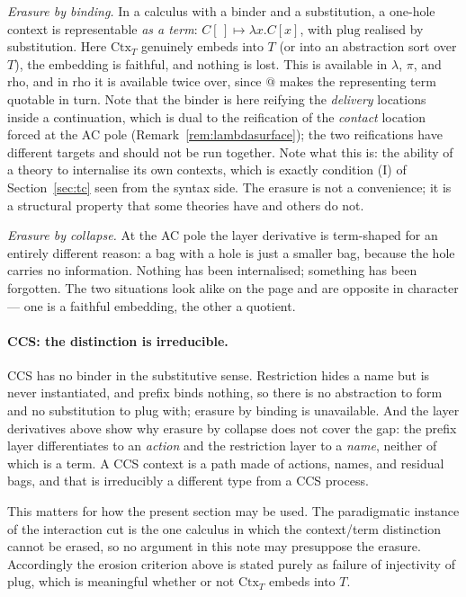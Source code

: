 \documentclass[11pt,a4paper]{article}
\theoremstyle{definition}
\theoremstyle{plain}
\theoremstyle{remark}
\newcommand{\Ctx}{\mathrm{Ctx}}
\begin{document}
\emph{Erasure by binding.} In a calculus with a binder and a substitution, a one-hole
context is representable \emph{as a term}: $C[\,] \mapsto \lambda x.C[x]$, with
$\mathrm{plug}$ realised by substitution. Here $\Ctx_T$ genuinely embeds into $T$ (or
into an abstraction sort over $T$), the embedding is faithful, and nothing is lost.
This is available in $\lambda$, $\pi$, and rho, and in rho it is available twice over,
since $@$ makes the representing term quotable in turn. Note that the binder is here
reifying the \emph{delivery} locations inside a continuation, which is dual to the
reification of the \emph{contact} location forced at the AC pole
(Remark~\ref{rem:lambdasurface}); the two reifications have different targets and
should not be run together. Note what this is: the ability
of a theory to internalise its own contexts, which is exactly condition (I) of
Section~\ref{sec:tc} seen from the syntax side. The erasure is not a convenience; it
is a structural property that some theories have and others do not.

\emph{Erasure by collapse.} At the AC pole the layer derivative is term-shaped for an
entirely different reason: a bag with a hole is just a smaller bag, because the hole
carries no information. Nothing has been internalised; something has been forgotten.
The two situations look alike on the page and are opposite in character --- one is a
faithful embedding, the other a quotient.

\paragraph{CCS: the distinction is irreducible.}
CCS has no binder in the substitutive sense. Restriction hides a name but is never
instantiated, and prefix binds nothing, so there is no abstraction to form and no
substitution to plug with; erasure by binding is unavailable. And the layer
derivatives above show why erasure by collapse does not cover the gap: the prefix
layer differentiates to an \emph{action} and the restriction layer to a \emph{name},
neither of which is a term. A CCS context is a path made of actions, names, and
residual bags, and that is irreducibly a different type from a CCS process.

This matters for how the present section may be used. The paradigmatic instance of
the interaction cut is the one calculus in which the context/term distinction cannot
be erased, so no argument in this note may presuppose the erasure. Accordingly the
erosion criterion above is stated purely as failure of injectivity of
$\mathrm{plug}$, which is meaningful whether or not $\Ctx_T$ embeds into $T$.
\end{document}
